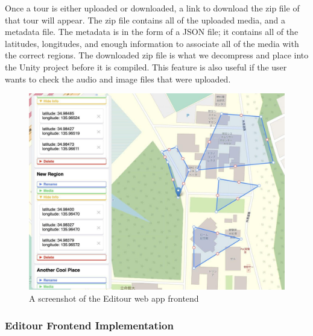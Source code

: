 \documentclass[a4paper, 10pt, american, titlepage]{article}
\begin{document}
Once a tour is either uploaded or downloaded, a link to download the zip file of
that tour will appear. The zip file contains all of the uploaded media, and a
metadata file. The metadata is in the form of a JSON file; it contains all of
the latitudes, longitudes, and enough information to associate all of the media
with the correct regions. The downloaded zip file is what we decompress and
place into the Unity project before it is compiled. This feature is also useful
if the user wants to check the audio and image files that were uploaded.

\begin{figure}[h]
	\centering
	\includegraphics[width=\textwidth]{editour.jpg}
	\caption{A screenshot of the Editour web app frontend}
	\label{fig:editour}
\end{figure}

\subsubsection{Editour Frontend Implementation}
\label{sec:editourFrontendImplementation}
\end{document}
